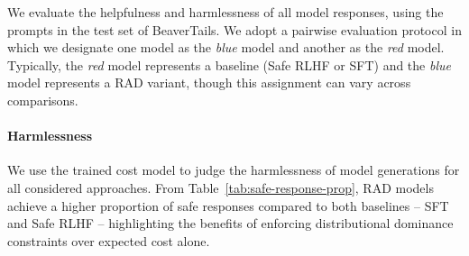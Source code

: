We evaluate the helpfulness and harmlessness of all model responses, using the prompts in the test set of BeaverTails. We adopt a pairwise evaluation protocol in which we designate one model as the \emph{blue} model and another as the \emph{red} model. Typically, the \emph{red} model represents a baseline (Safe RLHF or SFT) and the \emph{blue} model represents a RAD variant, though this assignment can vary across comparisons.

\paragraph{Harmlessness}

We use the trained cost model to judge the harmlessness of model generations for all considered approaches. From Table~\ref{tab:safe-response-prop}, RAD models achieve a higher proportion of safe responses compared to both baselines -- SFT and
Safe RLHF -- highlighting the benefits of enforcing distributional dominance constraints over expected cost alone.

